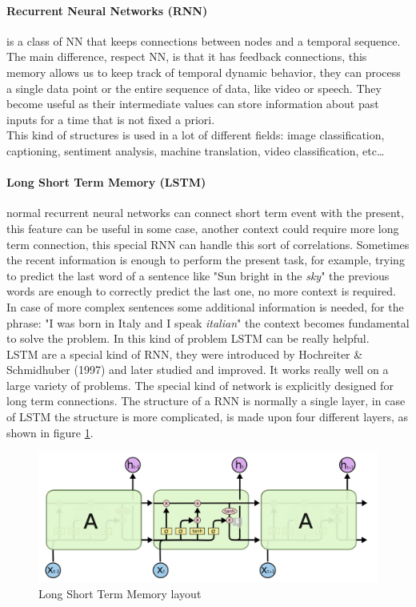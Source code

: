 \documentclass[%
    corpo=12pt,
    twoside,
    oldstyle,
    autoretitolo,
    greek,
    evenboxes,
]{toptesi}
\begin{document}
\paragraph{Recurrent Neural Networks (RNN)}  is a class of NN that keeps connections between nodes and a temporal sequence. The main difference, respect NN, is that it has feedback connections, this memory allows us to keep track of temporal dynamic behavior, they can process a single data point or the entire sequence of data, like video or speech. They become useful as their intermediate values can store information about past inputs for a time that is not fixed a priori.\\
This kind of structures is used in a lot of different fields: image classification, captioning, sentiment analysis, machine translation, video classification, etc\dots

\paragraph{Long Short Term Memory (LSTM)} normal recurrent neural networks can connect short term event with the present, this feature can be useful in some case, another context could require more long term connection, this special RNN can handle this sort of correlations. Sometimes the recent information is enough to perform the present task, for example, trying to predict the last word of a sentence like "Sun bright in the \textit{sky}" the previous words are enough to correctly predict the last one, no more context is required. In case of more complex sentences some additional information is needed, for the phrase: "I was born in Italy and I speak \textit{italian}" the context becomes fundamental to solve the problem. In this kind of problem LSTM can be really helpful.\\
LSTM are a special kind of RNN, they were introduced by Hochreiter \& Schmidhuber (1997) \cite{lstm} and later studied and improved. It works really well on a large variety of problems. The special kind of network is explicitly designed for long term connections.
The structure of a RNN is normally a single layer, in case of LSTM the structure is more complicated, is made upon four different layers, as shown in figure \ref{fig:lstm}.

\begin{figure}[!ht]
  \includegraphics[width=\linewidth]{figure/lstm.png}
  \caption{Long Short Term Memory layout \cite{lstm_image}}
  \label{fig:lstm}
\end{figure}
\end{document}
